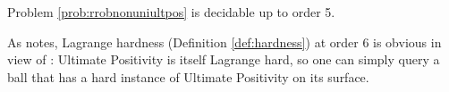 \begin{theorem}
\label{thm:decide2}
Problem \ref{prob:rrobnonuniultpos} is decidable up to order 5.
\end{theorem}

As \cite{originalarxiv} notes, Lagrange hardness (Definition \ref{def:hardness}) at order 6 is obvious in view of \cite{joeljames3}: Ultimate Positivity is itself Lagrange hard, so one can simply query a ball that has a hard instance of Ultimate Positivity on its surface.

